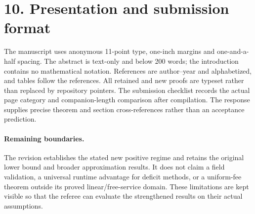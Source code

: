 \section*{10. Presentation and submission format}
The manuscript uses anonymous 11-point type, one-inch margins and one-and-a-half spacing. The abstract is text-only and below 200 words; the introduction contains no mathematical notation. References are author--year and alphabetized, and tables follow the references. All retained and new proofs are typeset rather than replaced by repository pointers. The submission checklist records the actual page category and companion-length comparison after compilation. The response supplies precise theorem and section cross-references rather than an acceptance prediction.

\paragraph{Remaining boundaries.} The revision establishes the stated new positive regime and retains the original lower bound and broader approximation results. It does not claim a field validation, a universal runtime advantage for deficit methods, or a uniform-fee theorem outside its proved linear/free-service domain. These limitations are kept visible so that the referee can evaluate the strengthened results on their actual assumptions.
